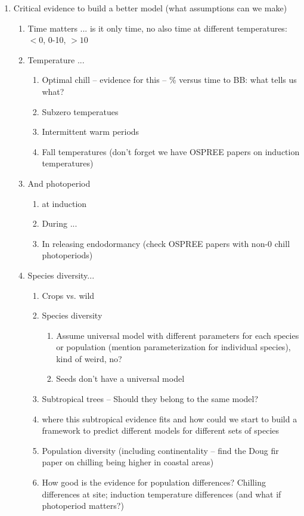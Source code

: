 \documentclass[11pt,letter]{article}
\begin{document}
\begin{enumerate}
\begin{enumerate}
\end{enumerate}
\item Critical evidence to build a better model (what assumptions can we make)
\begin{enumerate}
\item Time matters ... is it only time, no also time at different temperatures: $<0$, 0-10, $>10$
\item Temperature ... 
\begin{enumerate}
\item Optimal chill -- evidence for this -- \% versus time to BB: what tells us what? 
\item Subzero temperatues
\item Intermittent warm periods
\item Fall temperatures (don't forget we have OSPREE papers on induction temperatures)
\end{enumerate}
\item And photoperiod 
\begin{enumerate}
\item at induction
\item During ...
\item In releasing endodormancy (check OSPREE papers with non-0 chill photoperiods)
\end{enumerate} 
\item Species diversity... 
\begin{enumerate}
\item Crops vs. wild
\item Species diversity 
\begin{enumerate}
\item Assume universal model with different parameters for each species or population (mention parameterization for individual species), kind of weird, no?
\item Seeds don't have a universal model
\end{enumerate}
\item Subtropical trees -- Should they belong to the same model?
\item where this subtropical evidence fits and how could we start to build a framework to predict different models for different sets of species  %
\item Population diversity (including continentality -- find the Doug fir paper on chilling being higher in coastal areas)
\item How good is the evidence for population differences? Chilling differences at site; induction temperature differences (and what if photoperiod matters?)

\end{enumerate}
\end{enumerate}
\end{enumerate}
\end{document}
